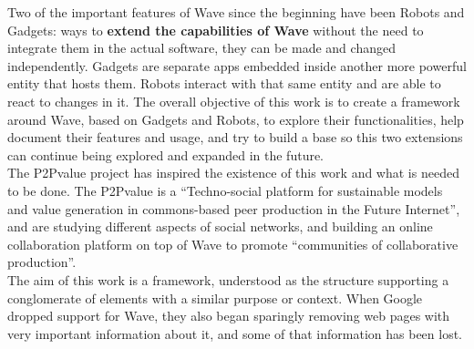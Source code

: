Two of the important features of Wave since the beginning have been Robots and Gadgets: ways to \textbf{extend the capabilities of Wave} without the need to integrate them in the actual software, they can be made and changed independently. Gadgets are separate apps embedded inside another more powerful entity that hosts them. Robots interact with that same entity and are able to react to changes in it. The overall objective of this work is to create a framework around Wave, based on Gadgets and Robots, to explore their functionalities, help document their features and usage, and try to build a base so this two extensions can continue being explored and expanded in the future.\\[.2cm]
The P2Pvalue \cite{ref:p2pvalue} project has inspired the existence of this work and what is needed to be done. The P2Pvalue is a ``Techno-social platform for sustainable models and value generation in commons-based peer production in the Future Internet'', and are studying different aspects of social networks, and building an online collaboration platform on top of Wave to promote ``communities of collaborative production''.\\[.2cm]
The aim of this work is a framework, understood as the structure supporting a conglomerate of elements with a similar purpose or context. When Google dropped support for Wave, they also began sparingly removing web pages with very important information about it, and some of that information has been lost.

